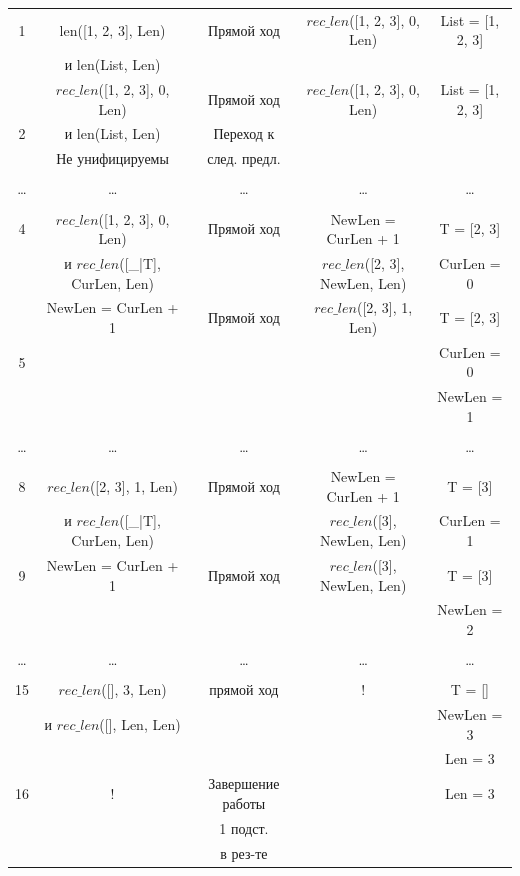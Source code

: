 \begin{landscape}
\begin{longtable}{|c|c|c|c|c|}
      \hline
          1 & len([1, 2, 3], Len) & Прямой ход & $rec\_len$([1, 2, 3], 0, Len) & List = [1, 2, 3]\\
           & и len(List, Len) & & &\\
    \hline
     & $rec\_len$([1, 2, 3], 0, Len) & Прямой ход & $rec\_len$([1, 2, 3], 0, Len) & List = [1, 2, 3]\\
          2 & и len(List, Len) & Переход к & &\\
           & Не унифицируемы & след. предл. & &\\
          \hline
    &&&&\\
    \dots & \dots & \dots & \dots & \dots \\
    &&&&\\
    \hline 
    4 & $rec\_len$([1, 2, 3], 0, Len) & Прямой ход & NewLen = CurLen + 1 & T = [2, 3]\\
            & и $rec\_len$([\_|T], CurLen, Len) & & $rec\_len$([2, 3], NewLen, Len) & CurLen = 0\\
          \hline 
       & NewLen = CurLen + 1 & Прямой ход & $rec\_len$([2, 3], 1, Len) & T = [2, 3]\\
          5 & & & & CurLen = 0\\
           & & & & NewLen = 1\\
          \hline
    &&&&\\
    \dots & \dots & \dots & \dots & \dots \\
    &&&&\\
          \hline 
      8 & $rec\_len$([2, 3], 1, Len) & Прямой ход & NewLen = CurLen + 1 & T = [3]\\
            & и $rec\_len$([\_|T], CurLen, Len) & & $rec\_len$([3], NewLen, Len) & CurLen = 1\\
          \hline 
      9 & NewLen = CurLen + 1 & Прямой ход & $rec\_len$([3], NewLen, Len) & T = [3]\\
            & & &  & NewLen = 2\\
          \hline
    &&&&\\
    \dots & \dots & \dots & \dots & \dots \\
    &&&&\\
    \hline 
      15 & $rec\_len$([], 3, Len) & прямой ход & ! & T = []\\
            & и $rec\_len$([], Len, Len) & &  & NewLen = 3\\
            & & &  & Len = 3\\
          \hline 
      16 & ! & Завершение работы & & Len = 3\\
            & & 1 подст. &  & \\
            & & в рез-те & & \\
  \end{longtable}
\end{landscape}

